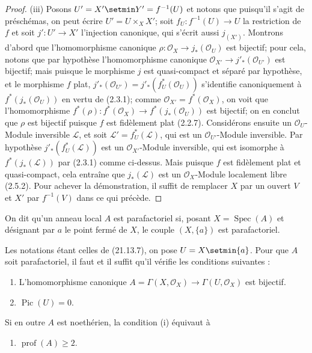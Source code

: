 \begin{proof}
(iii) Posons $U'=X'\setmin Y'=f^{-1}(U)$ et notons que puisqu'il s'agit de préschémas, on
peut écrire $U'=U\times_X X'$; soit $f_U:f^{-1}(U)\to U$ la restriction de $f$ et
soit $j':U'\to X'$ l'injection canonique, qui s'écrit aussi $j_{(X')}$. Montrons
d'abord que l'homomorphisme canonique
$\rho:\mathcal O_X\to j_*(\mathcal O_U)$ est bijectif; pour cela, notons que par
hypothèse l'homomorphisme canonique
$\mathcal O_{X'}\to j'_*(\mathcal O_{U'})$ est bijectif; mais puisque le morphisme
$j$ est quasi-compact et séparé par hypothèse, et le morphisme $f$ plat,
$j'_*(\mathcal O_{U'})=j'_*(f_U^*(\mathcal O_U))$ s'identifie canoniquement à
$f^*(j_*(\mathcal O_U))$ en vertu de (2.3.1); comme
$\mathcal O_{X'}=f^*(\mathcal O_X)$, on voit que l'homomorphisme
$f^*(\rho):f^*(\mathcal O_X)\to f^*(j_*(\mathcal O_U))$ est bijectif; on en conclut
que $\rho$ est bijectif puisque $f$ est fidèlement plat (2.2.7). Considérons ensuite
un $\mathcal O_U$-Module inversible $\mathscr L$, et soit
$\mathscr L'=f_U^*(\mathscr L)$, qui est un $\mathcal O_{U'}$-Module inversible. Par
hypothèse $j'_*(f_U^*(\mathscr L))$ est un $\mathcal O_{X'}$-Module inversible, qui
est isomorphe à $f^*(j_*(\mathscr L))$ par (2.3.1) comme ci-dessus. Mais puisque $f$
est fidèlement plat et quasi-compact, cela entraîne que $j_*(\mathscr L)$ est un
$\mathcal O_X$-Module localement libre (2.5.2). Pour achever la démonstration, il
suffit de remplacer $X$ par un ouvert $V$ et $X'$ par $f^{-1}(V)$ dans ce qui
précède.
\end{proof}

\begin{definition}[21.13.7]
On dit qu'un anneau local $A$ est parafactoriel si, posant
$X=\operatorname{Spec}(A)$ et désignant par $a$ le point fermé de $X$, le couple
$(X,\{a\})$ est parafactoriel.
\end{definition}

\begin{proposition}[21.13.8]
\label{IV.21.13.8}
Les notations étant celles de \textup{(21.13.7)}, on pose $U=X\setmin\{a\}$. Pour que $A$ soit
parafactoriel, il faut et il suffit qu'il vérifie les conditions suivantes :
\begin{enumerate}[label=\textup{(\roman*)}]
  \item L'homomorphisme canonique
  $A=\Gamma(X,\mathcal O_X)\to\Gamma(U,\mathcal O_X)$ est bijectif.
  \item $\operatorname{Pic}(U)=0$.
\end{enumerate}

Si en outre $A$ est noethérien, la condition \textup{(i)} équivaut à
\begin{enumerate}
  \item[\textup{(i \emph{bis})}] $\operatorname{prof}(A)\geq2$.
\end{enumerate}
\end{proposition}

